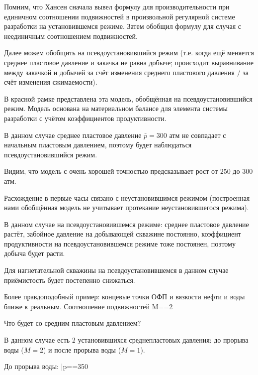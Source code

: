 \documentclass[main.tex]{subfiles}
\begin{document}
Помним, что Хансен сначала вывел формулу для производительности при единичном соотношении подвижностей в произвольной регулярной системе разработки на установившемся режиме. Затем обобщил формулу для случая с неединичным соотношением подвижностей.

Далее можем обобщить на псевдоустановившийся режим (т.е. когда ещё меняется среднее пластовое давление и закачка не равна добыче; происходит выравнивание между закачкой и добычей за счёт изменения среднего пластового давления / за счёт изменения сжимаемости).

В красной рамке представлена эта модель, обобщённая на псевдоустановившийся режим. Модель основана на материальном балансе для элемента системы разработки с учётом коэффициентов продуктивности.



В данном случае среднее пластовое давление $\bar{p}=300\text{ атм}$ не совпадает с начальным пластовым давлением, поэтому будет наблюдаться псевдоустановившийся режим.

Видим, что модель с очень хорошей точностью предсказывает рост от 250 до 300 атм.


Расхождение в первые часы связано с неустановившимся режимом (построенная нами обобщённая модель не учитывает протекание неустановившегося режима).

В данном случае на псевдоустановившемся режиме: среднее пластовое давление растёт, забойное давление на добывающей скважине постоянно, коэффициент продуктивности на псевдоустановившемся режиме тоже постоянен, поэтому добыча будет расти.


Для нагнетательной скважины на псевдоустановившемся в данном случае приёмистость будет постепенно снижаться.


Более правдоподобный пример: концевые точки ОФП и вязкости нефти и воды ближе к реальным. Соотношение подвижностей
\beq
M==2
\eeq

Что будет со средним пластовым давлением?

В данном случае есть 2 установившихся среднепластовых давления: до прорыва воды ($M=2$) и после прорыва воды ($M=1$).

До прорыва воды:
\beq
\bar{p}==350
\eeq
\end{document}
